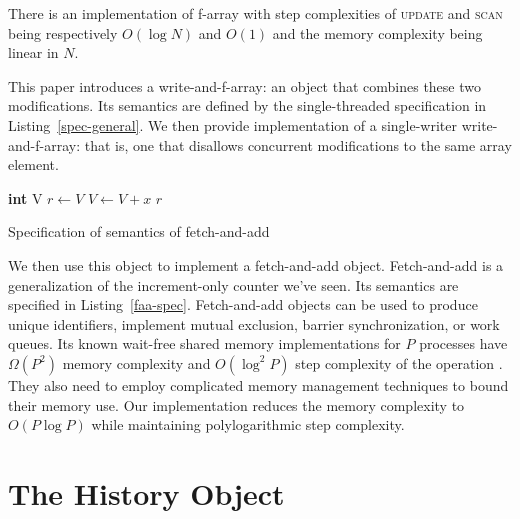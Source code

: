 \documentclass[a4paper,11pt]{article}
\newcommand{\fn}[1]{\textsc{#1}}
\begin{document}
There is an implementation of f-array with step complexities of \fn{update} and \fn{scan} being respectively $O(\log N)$ and $O(1)$ and the memory complexity
being linear in $N$.

This paper introduces a write-and-f-array: an object that combines these two modifications. Its semantics are defined by the single-threaded specification in Listing~\ref{spec-general}. We then provide implementation of a single-writer
write-and-f-array: that is, one that disallows concurrent modifications to the same array element.

\begin{Listing}
\begin{algorithmic}[1]
\State \textbf{int} V
	\State $r \gets V$
	\State $V \gets V + x$
	\State\Return $r$
\EndFunction
\end{algorithmic}
\caption{Specification of semantics of fetch-and-add}
\label{faa-spec}
\end{Listing}

We then use this object to implement a fetch-and-add object. Fetch-and-add is a generalization of the increment-only counter we've seen. Its semantics are specified in Listing~\ref{faa-spec}.
Fetch-and-add objects can be used to produce unique identifiers, implement
mutual exclusion, barrier synchronization\cite{faa-sync}, or work queues\cite{faa-queue}. Its known wait-free shared memory implementations for $P$ processes have $\Omega(P^2)$ memory complexity and $O(\log^2 P)$ step complexity
of the operation \cite{ellen-fai}\cite{closed-object}. They also need to employ complicated memory management techniques to bound their memory use. Our implementation reduces the memory complexity to $O(P\log P)$ while maintaining polylogarithmic step complexity.




\section{The History Object}
\end{document}
